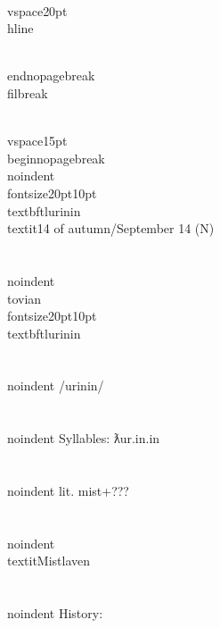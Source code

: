 \\vspace{20pt}\\hline

\\end{nopagebreak}
\\filbreak



\\vspace{15pt}
\\begin{nopagebreak}
\\noindent{\\fontsize{20pt}{10pt}\\textbf{tlurinin} } \\textit{14 of autumn/September 14} (N)\\\\
\\noindent {\\tovian \\fontsize{20pt}{10pt} \\textbf{tlurinin} }\\\\
\\noindent /{}ur{\textprimstress}inin/\\\\
\\noindent Syllables: ƛur.in.in\\\\
\\noindent lit. mist+???\\\\
\\noindent \\textit{Mistlaven}\\\\


\\noindent History:

